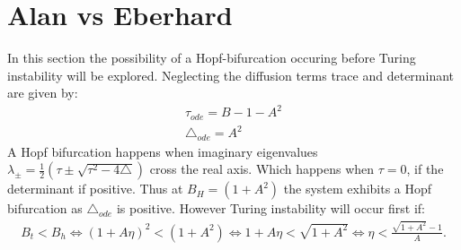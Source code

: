 \section{Alan vs Eberhard}
In this section the possibility of a Hopf-bifurcation occuring before Turing instability will be explored. Neglecting the diffusion terms trace and determinant are given by:
\begin{align}
\tau_{ode} = B - 1 - A^2 \\
\triangle_{ode} = A^2
\end{align}
A Hopf bifurcation happens when imaginary eigenvalues $\lambda_\pm = \frac{1}{2}(\tau \pm \sqrt{\tau^2 - 4\triangle})$ cross the real axis. Which happens when $\tau = 0$, if the determinant if positive. Thus at $B_H = (1 + A^2)$ the system exhibits a Hopf bifurcation as $\triangle_{ode}$ is positive. However Turing instability will occur first if:
\begin{align}
B_t < B_h \Leftrightarrow (1 + A\eta)^2 < (1 + A^2) \Leftrightarrow 1 + A\eta < \sqrt{1 + A^2} \Leftrightarrow \eta < \frac{\sqrt{1 + A^2} - 1}{A}.
\end{align}





